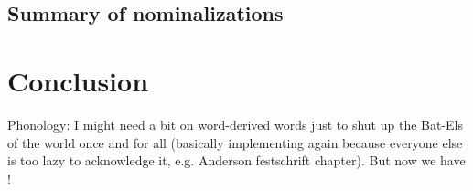 	\subsection{Summary of nominalizations}

\section{Conclusion}
	Phonology: I might need a bit on word-derived words just to shut up the Bat-Els of the world once and for all (basically implementing \cite{arad03} again because everyone else is too lazy to acknowledge it, e.g. \cite{batel17} Anderson festschrift chapter). But now we have \cite{kastnertucker19cup}!

